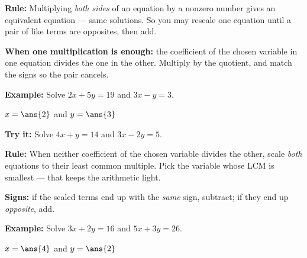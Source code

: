\documentclass[12pt]{article}
\begin{document}


\begin{formulabox}
\textbf{Rule:} Multiplying \emph{both sides} of an equation by a nonzero number gives an equivalent equation --- same solutions. So you may rescale one equation until a pair of like terms are opposites, then add.\par
\textbf{When one multiplication is enough:} the coefficient of the chosen variable in one equation divides the one in the other. Multiply by the quotient, and match the signs so the pair cancels.
\end{formulabox}

\begin{examplebox}
\textbf{Example:} \quad Solve $2x + 5y = 19$ and $3x - y = 3$.

$x = \ans{2}$ \quad and \quad $y = \ans{3}$
\end{examplebox}

\begin{tryitbox}
\textbf{Try it:} \quad Solve $4x + y = 14$ and $3x - 2y = 5$.\\[2pt]
\end{tryitbox}


\begin{formulabox}
\textbf{Rule:} When neither coefficient of the chosen variable divides the other, scale \emph{both} equations to their least common multiple. Pick the variable whose LCM is smallest --- that keeps the arithmetic light.\par
\textbf{Signs:} if the scaled terms end up with the \emph{same} sign, subtract; if they end up \emph{opposite}, add.
\end{formulabox}

\begin{examplebox}
\textbf{Example:} \quad Solve $3x + 2y = 16$ and $5x + 3y = 26$.

$x = \ans{4}$ \quad and \quad $y = \ans{2}$
\end{examplebox}
\end{document}
